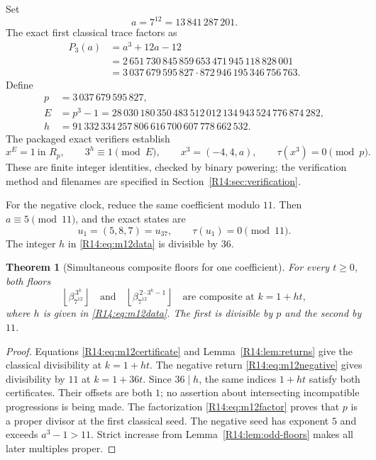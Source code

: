 \documentclass[11pt,a4paper]{article}
\newtheorem{theorem}{Theorem}[section]
\theoremstyle{definition}\newtheorem{definition}[theorem]{Definition}
\theoremstyle{remark}\newtheorem{remark}[theorem]{Remark}
\newcommand{\floor}[1]{\left\lfloor#1\right\rfloor}
\begin{document}
Set
\[
 a=7^{12}=13\,841\,287\,201.
\]
The exact first classical trace factors as
\begin{equation}\label{R14:eq:m12factor}
 \begin{aligned}
 P_3(a)&=a^3+12a-12\\
 &=2\,651\,730\,845\,859\,653\,471\,945\,118\,828\,001\\
 &=3\,037\,679\,595\,827\cdot872\,946\,195\,346\,756\,763.
 \end{aligned}
\end{equation}
Define
\begin{equation}\label{R14:eq:m12data}
 \begin{aligned}
 p&=3\,037\,679\,595\,827,\\
 E&=p^3-1
   =28\,030\,180\,350\,483\,512\,012\,134\,943\,524\,776\,874\,282,\\
 h&=91\,332\,334\,257\,806\,616\,700\,607\,778\,662\,532.
 \end{aligned}
\end{equation}
The packaged exact verifiers establish
\begin{equation}\label{R14:eq:m12certificate}
 x^E=1\ \text{in }R_p,\qquad
 3^h\equiv1\pmod E,\qquad
 x^3=(-4,4,a),\qquad\tau(x^3)=0\pmod p.
\end{equation}
These are finite integer identities, checked by binary powering;
the verification method and filenames are specified in
Section~\ref{R14:sec:verification}.

For the negative clock, reduce the same coefficient modulo $11$.
Then $a\equiv5\pmod{11}$, and the exact states are
\begin{equation}\label{R14:eq:m12negative}
 u_1=(5,8,7)=u_{37},\qquad\tau(u_1)=0\pmod{11}.
\end{equation}
The integer $h$ in \eqref{R14:eq:m12data} is divisible by $36$.

\begin{theorem}[Simultaneous composite floors for one coefficient]
\label{R14:thm:m12}
For every $t\ge0$, both floors
\[
 \floor{\beta_{7^{12}}^{\,3^k}}\quad\text{and}\quad
 \floor{\beta_{7^{12}}^{\,2\cdot3^k-1}}
 \quad\text{are composite at }k=1+ht,
\]
where $h$ is given in \eqref{R14:eq:m12data}. The first is divisible
by $p$ and the second by $11$.
\end{theorem}

\begin{proof}
Equations \eqref{R14:eq:m12certificate} and
Lemma~\ref{R14:lem:returns} give the classical divisibility at
$k=1+ht$. The negative return \eqref{R14:eq:m12negative} gives
divisibility by $11$ at $k=1+36t$. Since $36\mid h$, the same
indices $1+ht$ satisfy both certificates. Their offsets are both
$1$; no assertion about intersecting incompatible progressions is
being made. The factorization \eqref{R14:eq:m12factor} proves that $p$
is a proper divisor at the first classical seed. The negative seed
has exponent $5$ and exceeds $a^3-1>11$. Strict increase from
Lemma~\ref{R14:lem:odd-floors} makes all later multiples proper.
\end{proof}
\end{document}
